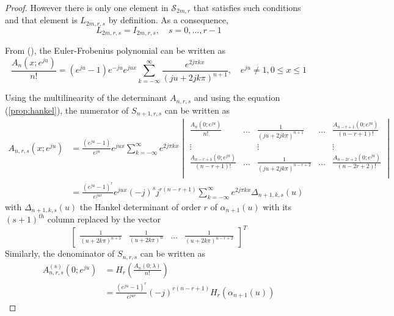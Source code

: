 \documentclass[a4paper, 11pt]{article}
\begin{document}
\begin{proof}
  However there is only one element in $\mathscr{S}_{2m,r}$ that satisfies such conditions and that element is 
  $L_{2m,r,s}$ by definition. As a consequence,
  \begin{equation}
    L_{2m,r,s} = I_{2m,r,s}, \quad s=0, \ldots, r-1
  \end{equation}
  
  From (\cite[(7.14)]{Sch72b}), the Euler-Frobenius polynomial can be written as \begin{equation}\label{eq:sch-an}
      \frac{A_n(x;e^{ju})}{n!} = (e^{ju}-1)e^{-ju}e^{jux} \sum_{k=-\infty}^{\infty} \frac{e^{2j\pi kx}}{{(ju + 
      2jk\pi)}^{n+1}}, \quad e^{ju} \neq 1, 0 \leq x \leq 1
  \end{equation}
  
  Using the multilinearity of the determinant $A_{n,r,s}$ and using the equation (\ref{prop:hankel}), the numerator of 
  $S_{n+1,r,s}$ can be written as \begin{align*}
    A_{n,r,s}(x;e^{ju}) &= \frac{(e^{ju}-1)}{e^{ju}}e^{jux} \sum_{k=-\infty}^{\infty} e^{2j\pi kx}
    \begin{vmatrix}
      \frac{A_n(0;e^{ju})}{n!}  &  \hdots & \frac{1}{{(ju+2jk\pi)}^{n+1}} & \hdots &  
      \frac{A_{n-r+1}(0;e^{ju})}{(n-r+1)!} \\
      \vdots & & \vdots & & \vdots \\
      \frac{A_{n-r+1}(0;e^{ju})}{(n-r+1)!}  & \hdots & \frac{1}{{(ju+2jk\pi)}^{n-r+2}} & \hdots &  
      \frac{A_{n-2r+2}(0;e^{ju})}{(n-2r+2)!} \\
    \end{vmatrix} \\
    &= \frac{{(e^{ju}-1)}^r}{e^{jur}}e^{jux} {(-j)}^{s} j^{r(n-r+1)} \sum_{k=-\infty}^{\infty} e^{2j\pi kx} 
    \Delta_{n+1,k,s}(u)
  \end{align*}
  with $\Delta_{n+1,k,s}(u)$ the Hankel determinant of order $r$ of $\alpha_{n+1}(u)$ with its ${(s+1)}^{th}$ column 
  replaced by the vector
  \begin{equation*}
    \begin{bmatrix} \frac{1}{{(u+2k\pi)}^{n+1}} & \frac{1}{{(u+2k\pi)}^{n}} & \hdots & \frac{1}{{(u+2k\pi)}^{n-r+2}} 
    \end{bmatrix}^T
  \end{equation*}
  Similarly, the denominator of $S_{n,r,s}$ can be written as 
  \begin{align*}
    A^{(s)}_{n,r,s}(0;e^{ju}) &= H_r\left(\frac{A_n(0;\lambda)}{n!}\right) \\
    & = \frac{{(e^{ju}-1)}^r}{e^{jur}}{(-j)}^{r(n-r+1)} H_r(\alpha_{n+1}(u))
  \end{align*}
  

\end{proof}
\end{document}
